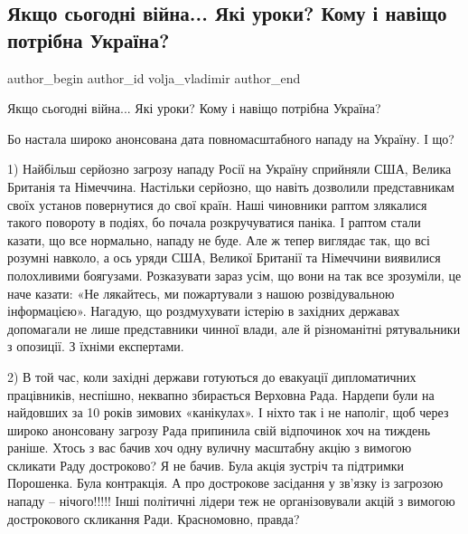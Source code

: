  
 
 
 
 
 
\subsection{Якщо сьогодні війна... Які уроки? Кому і навіщо потрібна Україна?}
\label{sec:25_01_2022.tg.volja_vladimir.1.vojna}
 
\ifcmt
 author_begin
   author_id volja_vladimir
 author_end
\fi

Якщо сьогодні війна... Які уроки? Кому і навіщо потрібна Україна?

Бо настала широко анонсована дата повномасштабного нападу на Україну. І що?

1) Найбільш серйозно загрозу нападу Росії на Україну сприйняли США, Велика
Британія та Німеччина. Настільки серйозно, що навіть дозволили представникам
своїх установ повернутися до свої країн.  Наші чиновники раптом злякалися
такого повороту в подіях, бо почала розкручуватися паніка. І раптом стали
казати, що все нормально, нападу не буде. Але ж тепер виглядає так, що всі
розумні навколо, а ось уряди США, Великої Британії та Німеччини виявилися
полохливими боягузами. Розказувати зараз усім, що вони на так все зрозуміли, це
наче казати: «Не лякайтесь, ми пожартували з нашою розвідувальною інформацією».
Нагадую, що роздмухувати істерію в західних державах допомагали не лише
представники чинної влади, але й різноманітні рятувальники з опозиції. З їхніми
експертами.  

2) В той час, коли західні держави готуються до евакуації дипломатичних
працівників, неспішно, неквапно збирається Верховна Рада.  Нардепи були на
найдовших за 10 років зимових «канікулах».  І ніхто так і не наполіг, щоб через
широко анонсовану загрозу Рада припинила свій відпочинок хоч на тиждень раніше.
Хтось з вас бачив хоч одну вуличну масштабну акцію з вимогою скликати Раду
достроково? Я не бачив. Була акція зустріч та підтримки Порошенка. Була
контракція. А про дострокове засідання у зв’язку із загрозою нападу –
нічого!!!!!  Інші політичні лідери теж не організовували акцій з вимогою
дострокового скликання Ради.  Красномовно, правда?

